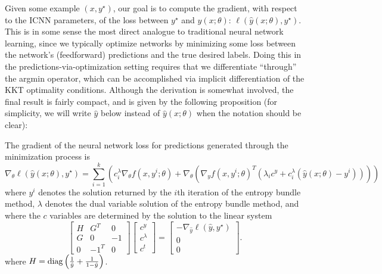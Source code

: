 Given some example $(x,y^\star)$, our goal is to compute the gradient, with
respect to the ICNN parameters, of the loss between $y^\star$ and $\hat{y}
(x;\theta)$:
$\ell(\hat{y}(x;\theta), y^\star)$.  This is in some sense the most direct
analogue to
traditional neural network learning, since we typically optimize networks by
minimizing some loss between the network's (feedforward) predictions and the true
desired labels.  Doing this in the predictions-via-optimization setting
requires that we differentiate ``through'' the argmin operator, which can be
accomplished via implicit differentiation of the KKT optimality conditions.
Although the derivation is somewhat involved, the final result is fairly
compact, and is given by the following proposition (for simplicity, we will
write $\hat{y}$ below instead of $\hat{y}(x;\theta)$ when the notation should
be clear):
\begin{proposition}
\label{proposition-gradient}
The gradient of the neural network loss for predictions generated through
the minimization process is
\begin{equation}
    \nabla_\theta \ell(\hat{y}(x;\theta), y^\star) = \sum_{i=1}^k (c^\lambda_i
    \nabla_\theta f(x, y^i;\theta) +
    \nabla_\theta \left(\nabla_y f(x,y^i;\theta)^T
    \left (\lambda_i c^y + c^\lambda_i \left (\hat{y}(x;\theta) - y^i \right )
    \right)\right) )
\end{equation}
where $y^i$ denotes the solution returned by the $i$th iteration of the entropy
bundle method, $\lambda$ denotes the dual variable solution of the entropy
bundle method, and where the $c$ variables are determined by the solution to the
linear system
\begin{equation}
\left [ \begin{array}{ccc}
H & G^T & 0 \\
G & 0 & -1 \\
0 & -1^T & 0 \end{array} \right ]
\left [ \begin{array}{c} c^y \\ c^\lambda \\ c^t \end{array} \right ]
=
\left [ \begin{array}{c} -\nabla_{\hat{y}} \ell(\hat{y}, y^\star) \\ 0 \\ 0
\end{array} \right ].
\end{equation}
where $H = \operatorname*{diag}\left(\frac{1}{\hat{y}} + \frac{1}{1-\hat{y}}\right)$.
\end{proposition}

